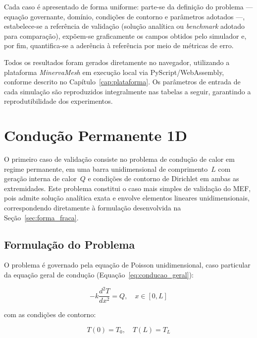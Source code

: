 Cada caso é apresentado de forma uniforme: parte-se da definição do problema --- equação governante, domínio, condições de contorno e parâmetros adotados ---, estabelece-se a referência de validação (solução analítica ou \textit{benchmark} adotado para comparação), expõem-se graficamente os campos obtidos pelo simulador e, por fim, quantifica-se a aderência à referência por meio de métricas de erro.

Todos os resultados foram gerados diretamente no navegador, utilizando a plataforma \textit{MinervaMesh} em execução local via PyScript/WebAssembly, conforme descrito no Capítulo~\ref{cap:plataforma}. Os parâmetros de entrada de cada simulação são reproduzidos integralmente nas tabelas a seguir, garantindo a reprodutibilidade dos experimentos.


\section{Condução Permanente 1D}
\label{sec:val_conducao1d}

O primeiro caso de validação consiste no problema de condução de calor em regime permanente, em uma barra unidimensional de comprimento~$L$ com geração interna de calor~$Q$ e condições de contorno de Dirichlet em ambas as extremidades. Este problema constitui o caso mais simples de validação do MEF, pois admite solução analítica exata e envolve elementos lineares unidimensionais, correspondendo diretamente à formulação desenvolvida na Seção~\ref{sec:forma_fraca}.

\subsection{Formulação do Problema}

O problema é governado pela equação de Poisson unidimensional, caso particular da equação geral de condução (Equação~\ref{eq:conducao_geral}):

\begin{equation}
    -k \frac{d^2 T}{dx^2} = Q, \quad x \in [0, L]
    \label{eq:val_conducao1d_edp}
\end{equation}

\noindent com as condições de contorno:

\begin{equation}
    T(0) = T_0, \quad T(L) = T_L
    \label{eq:val_conducao1d_cc}
\end{equation}

